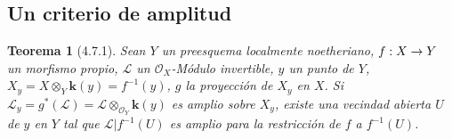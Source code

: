 \documentclass[10pt,oneside,openany]{book}
\theoremstyle{egaenv}\newtheorem*{env}{---}
\theoremstyle{egastatement}
\newtheorem*{theorem}{Teorema}
\theoremstyle{egadescription}
\newcommand{\oldpage}[2][]{\marginnote{\normalfont\scriptsize\textbf{#1}\,|\,#2}\ignorespaces}
\renewcommand{\to}{\mathchoice{\longrightarrow}{\rightarrow}{\rightarrow}{\rightarrow}}
\begin{document}
\oldpage[III]{145}

\subsection{Un criterio de amplitud}

\begin{theorem}[4.7.1]
\label{III.4.7.1-fr}
Sean $Y$ un preesquema localmente noetheriano, $f:X\to Y$ un morfismo
propio, $\mathcal L$ un $\mathcal O_X$-Módulo invertible, $y$ un punto de
$Y$, $X_y=X\otimes_Y\boldsymbol{k}(y)=f^{-1}(y)$, $g$ la proyección de $X_y$ en $X$.
Si $\mathcal L_y=g^*(\mathcal L)=\mathcal L\otimes_{\mathcal O_Y}\boldsymbol{k}(y)$ es
amplio sobre $X_y$, existe una vecindad abierta $U$ de $y$ en $Y$ tal que
$\mathcal L|f^{-1}(U)$ es amplio para la restricción de $f$ a $f^{-1}(U)$.
\end{theorem}
\end{document}
